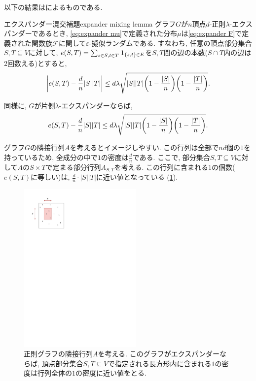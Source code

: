 以下の結果は\citet{AC88}によるものである.
%
\begin{lemma}{エクスパンダー混交補題}{expander mixing lemma}
    グラフ$G$が$n$頂点$d$-正則$\lambda$-エクスパンダーであるとき, \cref{eq:expander mu}で定義された分布$\mu$は\cref{eq:expander F}で定義された関数族$\mathcal{F}$に関して$\varepsilon$-擬似ランダムである.
    すなわち, 任意の頂点部分集合$S,T\subseteq V$に対して,
    $e(S,T) = \sum_{s\in S,t\in T} \mathbf{1}_{\{s,t\} \in E}$を$S,T$間の辺の本数($S\cap T$内の辺は2回数える)とすると,
    \[
        \abs*{e(S,T) - \frac{d}{n}|S||T|} \le d\lambda\sqrt{|S||T|\rbra*{1-\frac{|S|}{n}}\rbra*{1-\frac{|T|}{n}}}.
    \]

    同様に, $G$が片側$\lambda$-エクスパンダーならば,
    \[
        e(S,T) - \frac{d}{n}|S||T| \le d\lambda\sqrt{|S||T|\rbra*{1-\frac{|S|}{n}}\rbra*{1-\frac{|T|}{n}}}.
    \]
\end{lemma}
%
グラフ$G$の隣接行列$A$を考えるとイメージしやすい.
この行列は全部で$nd$個の$1$を持っているため, 全成分の中で$1$の密度は$\frac{d}{n}$である.
ここで, 部分集合$S,T\subseteq V$に対して$A$の$S\times T$で定まる部分行列$A_{S,T}$を考える.
この行列に含まれる$1$の個数($e(S,T)$に等しい)は, $\frac{d}{n}\cdot |S||T|$に近い値となっている (\cref{fig:EML}).
\begin{figure}[htbp]
    \begin{center}
        \includegraphics[width=6cm]{images/EML.pdf}
        \caption{正則グラフの隣接行列$A$を考える. このグラフがエクスパンダーならば, 頂点部分集合$S,T\subseteq V$で指定される長方形内に含まれる$1$の密度は行列全体の$1$の密度に近い値をとる. \label{fig:EML}}
    \end{center}
\end{figure}
%
